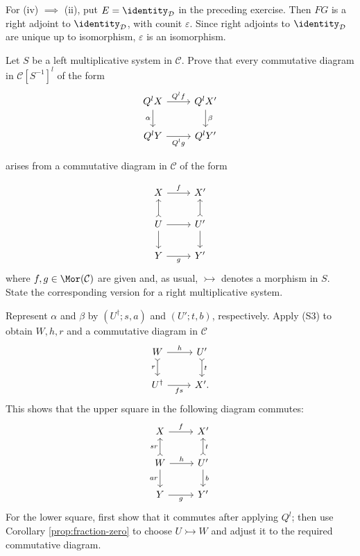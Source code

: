 \begin{Exercises}
\begin{hint}
		For (iv) $\implies$ (ii), put $E=\identity_{\mathcal{D}}$ in the
		preceding exercise. Then $FG$ is a right adjoint to
		$\identity_{\mathcal{D}}$, with counit $\varepsilon$. Since right
		adjoints to $\identity_{\mathcal{D}}$ are unique up to isomorphism,
		$\varepsilon$ is an isomorphism.
	\end{hint}

	\item Let $S$ be a left multiplicative system in $\mathcal{C}$. Prove that
	every commutative diagram in $\mathcal{C}[S^{-1}]^l$ of the form
	\[\begin{tikzcd}
		Q^l X \arrow[r, "{Q^l f}"] \arrow[d, "\alpha"'] & Q^l X' \arrow[d, "\beta"] \\
		Q^l Y \arrow[r, "{Q^l g}"'] & Q^l Y'
	\end{tikzcd}\]
	\begin{center}
		arises from a commutative diagram in $\mathcal{C}$ of the form
	\end{center}
	\[\begin{tikzcd}
		X \arrow[r, "f"] & X' \\
		U \arrow[r] \arrow[rightarrowtail, u] \arrow[d] & U' \arrow[rightarrowtail, u] \arrow[d] \\
		Y \arrow[r, "g"'] & Y'
	\end{tikzcd}\]
	where $f,g\in\Mor(\mathcal{C})$ are given and, as usual,
	$\rightarrowtail$ denotes a morphism in $S$. State the corresponding
	version for a right multiplicative system.

	\begin{hint}
		Represent $\alpha$ and $\beta$ by $(U^\dagger;s,a)$ and $(U';t,b)$,
		respectively. Apply (S3) to obtain $W,h,r$ and a commutative diagram in
		$\mathcal{C}$
		\[\begin{tikzcd}
			W \arrow[r, "h"] \arrow[rightarrowtail, d, "r"'] & U' \arrow[rightarrowtail, d, "{t}"] \\
			U^\dagger \arrow[r, "{fs}"'] & X' .
		\end{tikzcd}\]
		This shows that the upper square in the following diagram commutes:
		\[\begin{tikzcd}
			X \arrow[r, "f"] & X' \\
			W \arrow[rightarrowtail, u, "{sr}"] \arrow[r, "h"] \arrow[d, "{ar}"'] & U' \arrow[rightarrowtail, u, "{t}"'] \arrow[d, "{b}"] \\
			Y \arrow[r, "g"'] & Y'
		\end{tikzcd}\]
		For the lower square, first show that it commutes after applying $Q^l$;
		then use Corollary \ref{prop:fraction-zero} to choose
		$U\rightarrowtail W$ and adjust it to the required commutative diagram.
	\end{hint}


\end{Exercises}

